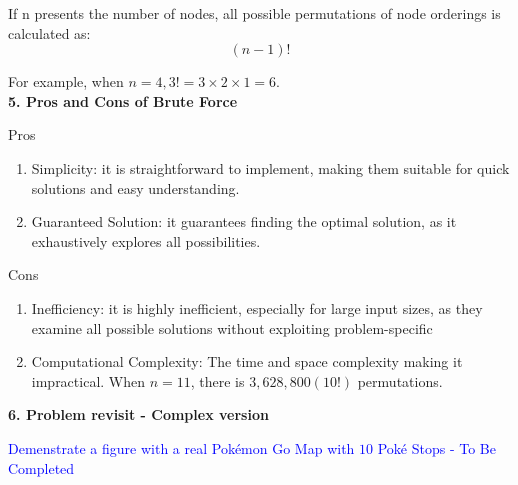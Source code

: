 \documentclass{article}
\begin{document}
If n presents the number of nodes, all possible permutations of node orderings is calculated as:
\[(n-1)!\]

For example, when $n = 4, 3! = 3 \times 2 \times 1 = 6$.\\

\textbf{5. Pros and Cons of Brute Force}

Pros
    \begin{enumerate}
        \item Simplicity: it is straightforward to implement, making them suitable for quick solutions and easy understanding.
        \item Guaranteed Solution: it guarantees finding the optimal solution, as it exhaustively explores all possibilities.
    \end{enumerate}

Cons
    \begin{enumerate}
        \item Inefficiency: it is highly inefficient, especially for large input sizes, as they examine all possible solutions without exploiting problem-specific
        \item Computational Complexity: The time and space complexity making it impractical. When $n=11$, there is $3,628,800 (10!)$ permutations. 
    \end{enumerate}

\textbf{6. Problem revisit - Complex version}

\textcolor{blue}{Demenstrate a figure with a real Pokémon Go Map with $10$ Poké Stops - To Be Completed} 
\end{document}
